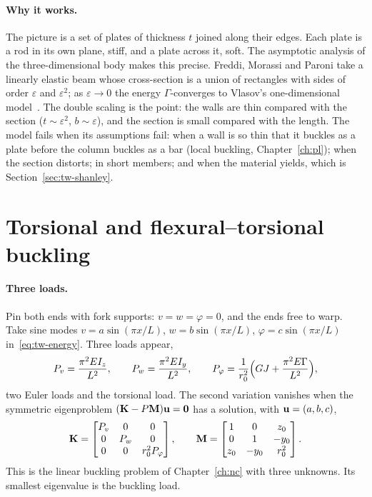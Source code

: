 \paragraph{Why it works.}
The picture is a set of plates of thickness $t$ joined along their edges. Each plate is a rod in its
own plane, stiff, and a plate across it, soft. The asymptotic analysis of the three-dimensional body
makes this precise. Freddi, Morassi and Paroni take a linearly elastic beam whose cross-section is
a union of rectangles with sides of order $\varepsilon$ and $\varepsilon^2$; as $\varepsilon \to 0$ the energy
$\Gamma$-converges to Vlasov's one-dimensional model~\cite{tw-freddi2007}. The double scaling is the
point: the walls are thin compared with the section ($t \sim \varepsilon^2$, $b \sim \varepsilon$), and the
section is small compared with the length. The model fails when its assumptions fail: when a wall
is so thin that it buckles as a plate before the column buckles as a bar (local buckling,
Chapter~\ref{ch:pl}); when the section distorts; in short members; and when the material yields,
which is Section~\ref{sec:tw-shanley}.

\section{Torsional and flexural--torsional buckling}\label{sec:tw-ft}
%

\paragraph{Three loads.}
Pin both ends with fork supports: $v = w = \varphi = 0$, and the ends free to warp. Take sine modes
$v = a\sin(\pi x/L)$, $w = b\sin(\pi x/L)$, $\varphi = c\sin(\pi x/L)$ in~\eqref{eq:tw-energy}. Three loads
appear,
\begin{equation}\label{eq:tw-three}
  P_v = \frac{\pi^2EI_z}{L^2} ,
  \qquad
  P_w = \frac{\pi^2EI_y}{L^2} ,
  \qquad
  P_\varphi = \frac{1}{r_0^2}\Bigl(GJ + \frac{\pi^2E\Gamma}{L^2}\Bigr) ,
\end{equation}
two Euler loads and the torsional load. The second variation vanishes when the symmetric
eigenproblem $(\mathbf{K} - P\mathbf{M})\mathbf{u} = \mathbf{0}$ has a solution, with $\mathbf{u} = (a, b, c)$,
\begin{equation}\label{eq:tw-eig}
  \mathbf{K} = \begin{bmatrix} P_v & 0 & 0\\ 0 & P_w & 0\\ 0 & 0 & r_0^2P_\varphi \end{bmatrix} ,
  \qquad
  \mathbf{M} = \begin{bmatrix} 1 & 0 & z_0\\ 0 & 1 & -y_0\\ z_0 & -y_0 & r_0^2 \end{bmatrix} .
\end{equation}
This is the linear buckling problem of Chapter~\ref{ch:nc} with three unknowns. Its smallest
eigenvalue is the buckling load.

